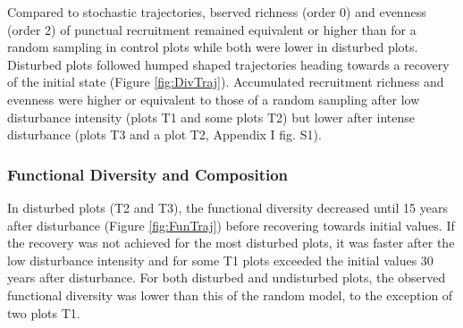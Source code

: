 \documentclass[fleqn,10pt]{ArtEcoFoG} %
\begin{document}
Compared to stochastic trajectories, bserved richness (order 0) and
evenness (order 2) of punctual recruitment remained equivalent or higher
than for a random sampling in control plots while both were lower in
disturbed plots. Disturbed plots followed humped shaped trajectories
heading towards a recovery of the initial state (Figure
\ref{fig:DivTraj}). Accumulated recruitment richness and evenness were
higher or equivalent to those of a random sampling after low disturbance
intensity (plots T1 and some plots T2) but lower after intense
disturbance (plots T3 and a plot T2, Appendix I fig. S1).

\subsubsection{Functional Diversity and
Composition}\label{functional-diversity-and-composition}

In disturbed plots (T2 and T3), the functional diversity decreased until
15 years after disturbance (Figure \ref{fig:FunTraj}) before recovering
towards initial values. If the recovery was not achieved for the most
disturbed plots, it was faster after the low disturbance intensity and
for some T1 plots exceeded the initial values 30 years after
disturbance. For both disturbed and undisturbed plots, the observed
functional diversity was lower than this of the random model, to the
exception of two plots T1.
\end{document}
